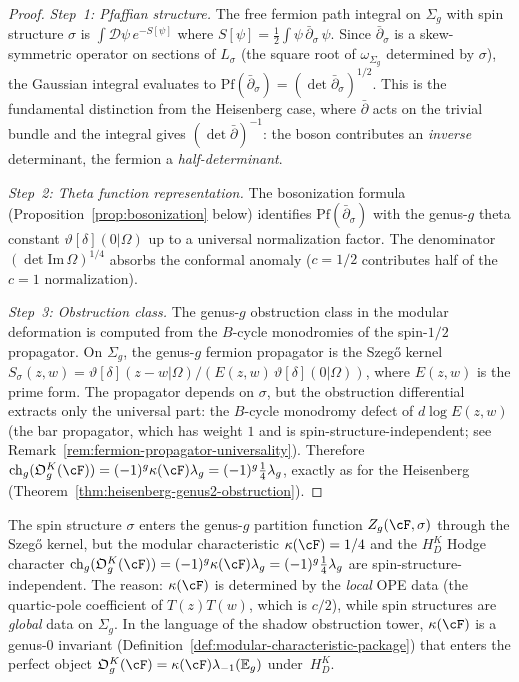 \begin{proof}
\emph{Step~1: Pfaffian structure.}
The free fermion path integral on $\Sigma_g$ with spin
structure $\sigma$ is
$\int \mathcal{D}\psi\, e^{-S[\psi]}$
where $S[\psi] = \frac{1}{2}\int \psi\, \bar\partial_\sigma\,\psi$.
Since $\bar\partial_\sigma$ is a skew-symmetric operator on
sections of $L_\sigma$ (the square root of $\omega_{\Sigma_g}$
determined by $\sigma$), the Gaussian integral evaluates to
$\mathrm{Pf}(\bar\partial_\sigma) = (\det \bar\partial_\sigma)^{1/2}$.
This is the fundamental distinction from the Heisenberg case,
where $\bar\partial$ acts on the trivial bundle and the integral
gives $(\det \bar\partial)^{-1}$: the boson contributes
an \emph{inverse} determinant, the fermion a
\emph{half-determinant}.

\emph{Step~2: Theta function representation.}
The bosonization formula (Proposition~\ref{prop:bosonization}
below) identifies
$\mathrm{Pf}(\bar\partial_\sigma)$ with the genus-$g$
theta constant $\vartheta[\delta](0|\Omega)$ up to a universal
normalization factor. The denominator
$(\det \mathrm{Im}\,\Omega)^{1/4}$ absorbs the conformal
anomaly ($c = 1/2$ contributes half of the $c = 1$
normalization).

\emph{Step~3: Obstruction class.}
The genus-$g$ obstruction class in the modular deformation is computed
from the $B$-cycle monodromies of the spin-$1/2$ propagator. On
$\Sigma_g$,
the genus-$g$ fermion propagator is the Szeg\H{o} kernel
$S_\sigma(z,w) = \vartheta[\delta](z{-}w|\Omega) /
(E(z,w)\, \vartheta[\delta](0|\Omega))$,
where $E(z,w)$ is the prime form. The propagator depends on
$\sigma$, but the obstruction differential extracts only the
universal part: the $B$-cycle monodromy defect of
$d\log E(z,w)$ (the bar propagator, which has weight $1$ and
is spin-structure-independent; see
Remark~\ref{rem:fermion-propagator-universality}).
Therefore $\operatorname{ch}_g(\mathfrak O_g^K(\cF))
=(-1)^g\kappa(\cF)\lambda_g=(-1)^g\frac14\lambda_g$, exactly as for the Heisenberg
(Theorem~\ref{thm:heisenberg-genus2-obstruction}).
\end{proof}

\begin{remark}
\label{rem:fermion-propagator-universality}
The spin structure $\sigma$ enters the genus-$g$ partition
function $Z_g(\cF, \sigma)$ through the Szeg\H{o} kernel, but
the modular characteristic $\kappa(\cF) = 1/4$ and the
$H_D^K$ Hodge character
\(\operatorname{ch}_g(\mathfrak O_g^K(\cF))
=(-1)^g\kappa(\cF)\lambda_g=(-1)^g\frac14\lambda_g\) are
spin-structure-independent. The reason: $\kappa(\cF)$ is determined
by the \emph{local} OPE data (the quartic-pole coefficient of
$T(z)T(w)$, which is $c/2$), while spin structures are
\emph{global} data on $\Sigma_g$. In the language of the
shadow obstruction tower, $\kappa(\cF)$ is a genus-$0$ invariant
(Definition~\ref{def:modular-characteristic-package}) that enters
the perfect object $\mathfrak O_g^K(\cF)=
\kappa(\cF)\lambda_{-1}(\mathbb E_g)$ under~$H_D^K$.
\end{remark}

